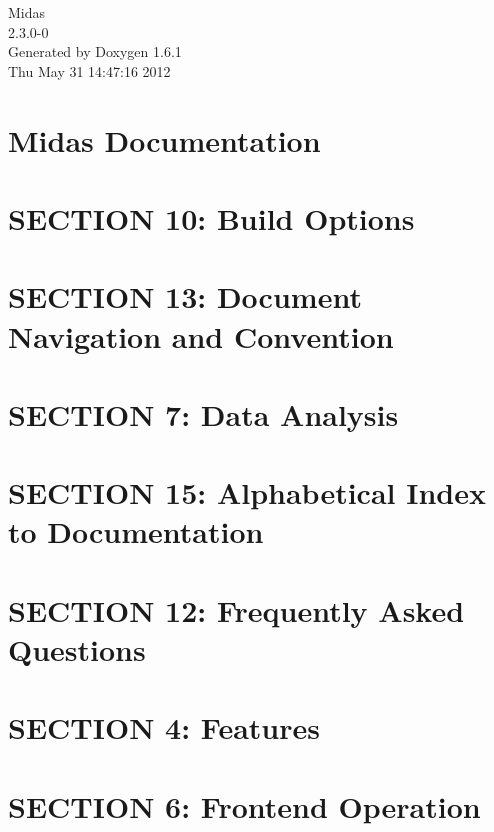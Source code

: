 \documentclass[letterpaper]{article}
\begin{document}
\begin{titlepage}
\vspace*{7cm}
\begin{center}
{\Large Midas \\[1ex]\large 2.3.0-\/0 }\\
\vspace*{1cm}
{\large Generated by Doxygen 1.6.1}\\
\vspace*{0.5cm}
{\small Thu May 31 14:47:16 2012}\\
\end{center}
\end{titlepage}
\tableofcontents
{}
\section{Midas Documentation}
\label{index}\hypertarget{index}{}
\section{SECTION 10: Build Options}
\label{BuildingOptions}

\section{SECTION 13: Document Navigation and Convention}
\label{Convention}

\section{SECTION 7: Data Analysis}
\label{DataAnalysis}

\section{SECTION 15: Alphabetical Index to Documentation}
\label{DocIndex}

\section{SECTION 12: Frequently Asked Questions}
\label{FAQ}

\section{SECTION 4: Features}
\label{Features}

\section{SECTION 6: Frontend Operation}
\label{FrontendOperation}

\end{document}
